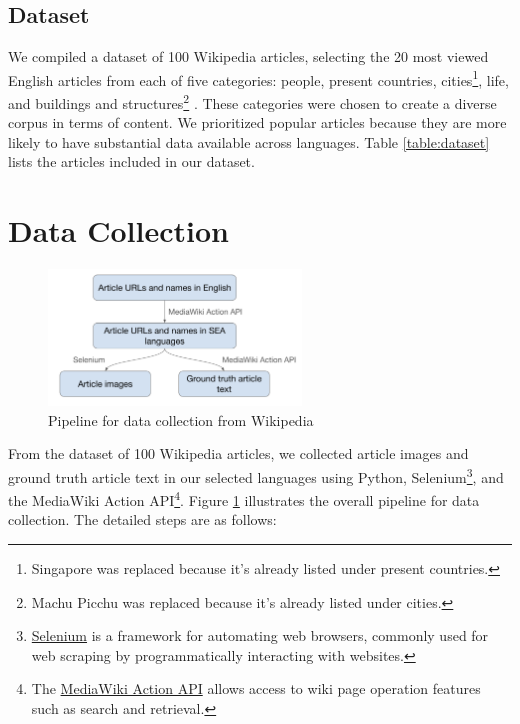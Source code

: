 \documentclass[12pt,oneside]{memoir}
\begin{document}
\subsection{Dataset}
We compiled a dataset of 100 Wikipedia articles, selecting the 20 most viewed English articles 
from each of five categories: people, present countries, cities\footnote{Singapore was replaced 
because it's already listed under present countries.}, life, and buildings and structures\footnote{Machu 
Picchu was replaced because it's already listed under cities.} 
\parencite{wikipedia-popular-pages-2024}.
These categories were chosen to create a diverse corpus in terms of content. 
We prioritized popular articles because they are more likely to have substantial data available across languages. 
Table \ref{table:dataset} lists the articles included in our dataset.

\section{Data Collection}

\begin{figure}[ht]
    \centering
    \includegraphics[width=0.6\textwidth]{images/data-collection.png}
    \caption{Pipeline for data collection from Wikipedia}
    \label{figure:data-collection}
\end{figure}

From the dataset of 100 Wikipedia articles, we collected article images and ground 
truth article text in our selected languages using Python, 
Selenium\footnote{\href{https://selenium-python.readthedocs.io}{Selenium} is a 
framework for automating web browsers, commonly used for web scraping by programmatically 
interacting with websites.}, and the MediaWiki Action API\footnote{The \href{https://www.mediawiki.org/wiki/API:Main_page}{MediaWiki Action API} allows 
access to wiki page operation features such as search and retrieval.}. Figure \ref{figure:data-collection} illustrates the overall pipeline 
for data collection. The detailed steps are as follows:
\end{document}
